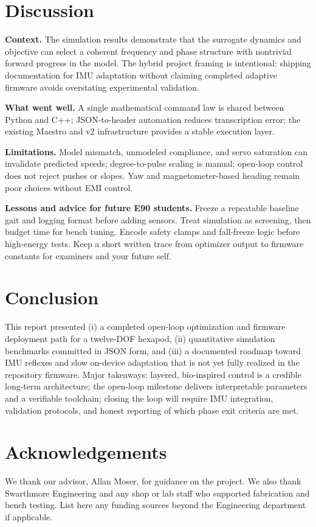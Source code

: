 \documentclass[11pt]{article}
\begin{document}
\section{Discussion}

\textbf{Context.} The simulation results demonstrate that the surrogate dynamics and objective can select a coherent frequency and phase structure with nontrivial forward progress in the model. The hybrid project framing is intentional: shipping documentation for IMU adaptation without claiming completed adaptive firmware avoids overstating experimental validation.

\textbf{What went well.} A single mathematical command law is shared between Python and C++; JSON-to-header automation reduces transcription error; the existing Maestro and v2 infrastructure provides a stable execution layer.

\textbf{Limitations.} Model mismatch, unmodeled compliance, and servo saturation can invalidate predicted speeds; degree-to-pulse scaling is manual; open-loop control does not reject pushes or slopes. Yaw and magnetometer-based heading remain poor choices without EMI control.

\textbf{Lessons and advice for future E90 students.} Freeze a repeatable baseline gait and logging format before adding sensors. Treat simulation as screening, then budget time for bench tuning. Encode safety clamps and fall-freeze logic before high-energy tests. Keep a short written trace from optimizer output to firmware constants for examiners and your future self.

\section{Conclusion}

This report presented (i) a completed open-loop optimization and firmware deployment path for a twelve-DOF hexapod, (ii) quantitative simulation benchmarks committed in JSON form, and (iii) a documented roadmap toward IMU reflexes and slow on-device adaptation that is not yet fully realized in the repository firmware. Major takeaways: layered, bio-inspired control is a credible long-term architecture; the open-loop milestone delivers interpretable parameters and a verifiable toolchain; closing the loop will require IMU integration, validation protocols, and honest reporting of which phase exit criteria are met.

\section*{Acknowledgements}
We thank our advisor, Allan Moser, for guidance on the project. We also thank Swarthmore Engineering and any shop or lab staff who supported fabrication and bench testing. List here any funding sources beyond the Engineering department if applicable.
\end{document}
